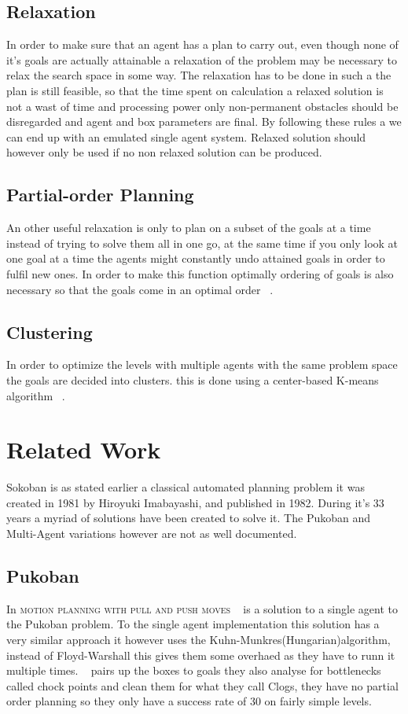 \documentclass[letterpaper]{article}
\begin{document}
	\subsection{Relaxation}
		In order to make sure that an agent has a plan to carry out, even though none of it's goals are actually attainable a relaxation of the problem may be necessary to relax the search space in some way. The relaxation has to be done in such a the plan is still feasible, so that the time spent on calculation a relaxed solution is not a wast of time and processing power only non-permanent obstacles should be disregarded and  agent and box parameters are final. By following these rules a we can end up with an emulated single agent system.
		Relaxed solution should however only be used if no non relaxed solution can be produced. 
	\subsection{Partial-order Planning}
		An other useful relaxation is only to plan on a subset of the goals at a time instead of trying to solve them all in one go, at the same time if you only look at one goal at a time the agents might constantly undo attained goals in order to fulfil new ones. In order to make this function optimally ordering of goals is also necessary so that the goals come in an optimal order ~\cite{Subgoals}.
	\subsection{Clustering}
		In order to optimize the levels with multiple agents with the same problem space the goals are decided into clusters. this is done using a center-based K-means algorithm ~\cite{K-Means}.
		
\section{Related Work}
	Sokoban is as stated earlier a classical automated planning problem it was created in 1981 by Hiroyuki Imabayashi, and published in 1982. During it's 33 years a myriad of solutions have been created to solve it.
	The Pukoban and Multi-Agent variations however are not as well documented.
	\subsection{Pukoban}
		In \textsc{motion planning with pull and push moves} ~\cite{Pukoban} is a solution to a single agent to the Pukoban problem. To the single agent implementation this solution has a very similar approach it however uses the Kuhn-Munkres(Hungarian)algorithm, instead of Floyd-Warshall this gives them some overhaed as they have to runn it multiple times.
		~\cite{Pukoban} pairs up the boxes to goals they also analyse for bottlenecks called chock points and clean them for what they call Clogs, they have no partial order planning   so they only have a success rate of 30 on fairly simple levels.
\end{document}
